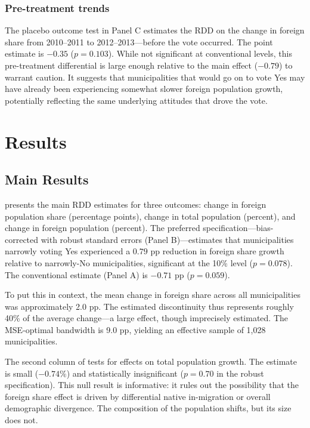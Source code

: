 \documentclass[12pt]{article}
\begin{document}
\subsubsection*{Pre-treatment trends} The placebo outcome test in  Panel C estimates the RDD on the change in foreign share from 2010--2011 to 2012--2013---before the vote occurred. The point estimate is $-0.35$ ($p = 0.103$). While not significant at conventional levels, this pre-treatment differential is large enough relative to the main effect ($-0.79$) to warrant caution. It suggests that municipalities that would go on to vote Yes may have already been experiencing somewhat slower foreign population growth, potentially reflecting the same underlying attitudes that drove the vote.


\section{Results}

\subsection{Main Results}

 presents the main RDD estimates for three outcomes: change in foreign population share (percentage points), change in total population (percent), and change in foreign population (percent). The preferred specification---bias-corrected with robust standard errors (Panel B)---estimates that municipalities narrowly voting Yes experienced a $0.79$ pp reduction in foreign share growth relative to narrowly-No municipalities, significant at the 10\% level ($p = 0.078$). The conventional estimate (Panel A) is $-0.71$ pp ($p = 0.059$).

To put this in context, the mean change in foreign share across all municipalities was approximately 2.0 pp. The estimated discontinuity thus represents roughly 40\% of the average change---a large effect, though imprecisely estimated. The MSE-optimal bandwidth is 9.0 pp, yielding an effective sample of 1,028 municipalities.

The second column of  tests for effects on total population growth. The estimate is small ($-0.74\%$) and statistically insignificant ($p = 0.70$ in the robust specification). This null result is informative: it rules out the possibility that the foreign share effect is driven by differential native in-migration or overall demographic divergence. The composition of the population shifts, but its size does not.
\end{document}
